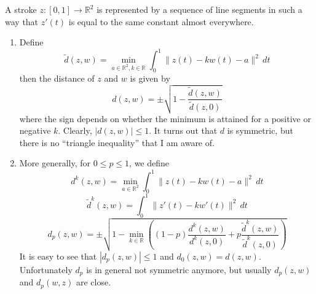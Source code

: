 \documentclass{article}
\newcommand{\R}{\mathbb{R}}
\begin{document}
A stroke $z: [0,1] \rightarrow \R^2$ is represented by a sequence of line
segments in such a way that $z'(t)$ is equal to the same constant almost
everywhere.  
\begin{enumerate}
\item
Define
\[ \tilde{d}(z,w) = \min_{a \in \R^2, k \in \R} \int_0^1 \|z(t) - k w(t) - a\|^2 \, dt \]
then the distance of $z$ and $w$ is given by
\[ d(z,w) = \pm \sqrt{1-\frac{\tilde{d}(z,w)}{\tilde{d}(z,0)}} \]
where the sign depends on whether the minimum is attained for a positive or
negative $k$.  Clearly, $|d(z,w)| \leq 1$.  It turns out that $d$ is symmetric,
but there is no ``triangle inequality'' that I am aware of.

\item
More generally, for $0 \leq p \leq 1$, we define
\[ d^k(z, w) = \min_{a \in \R^2} \int_0^1 \|z(t) - k w(t) - a\|^2 \, dt\]
\[ \tilde{d}^k(z, w) = \int_0^1 \|z'(t) - k w'(t)\|^2 \, dt\]
\[ d_p(z, w) = \pm \sqrt{1 - \min_{k \in \R}\left( (1-p)\frac{d^k(z,w)}{d^k(z,0)} + p\frac{\tilde{d}^k(z,w)}{\tilde{d}^k(z,0)} \right)} \]
It is easy to see that $|d_p(z,w)| \leq 1$ and $d_0(z,w) = d(z,w)$.
Unfortunately $d_p$ is in general not symmetric anymore, but usually
$d_p(z,w)$ and $d_p(w,z)$ are close.

\end{enumerate}
\end{document}
